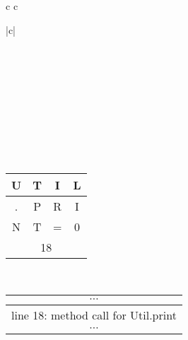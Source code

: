 \begin{figure}[h]

\begin{tabular}{c c}

		\begin{tabular}{|c|}
			\hline
			0 \\
			 \\
			 \\
			\hline
			\\ \\ \\ \\ \\ \\
			 \\
			\hline
			\begin{tabular}{|c|c|c|c|}
				U & T & I & L \\
				\hline
				. & P & R & I \\
				\hline
				N & T & = & 0 \\
				\hline 
				\multicolumn{4}{|c|}{18} \\
			\end{tabular}
			\\
			\hline
			\begin{tabular}{c}
				$ \cdots $ \\
				\hline
				line 18: method call for Util.print \\
				\hline
				$ \cdots $ \\
			\end{tabular}
			\\
			\hline 
		\end{tabular}


\end{tabular}
\end{figure}
